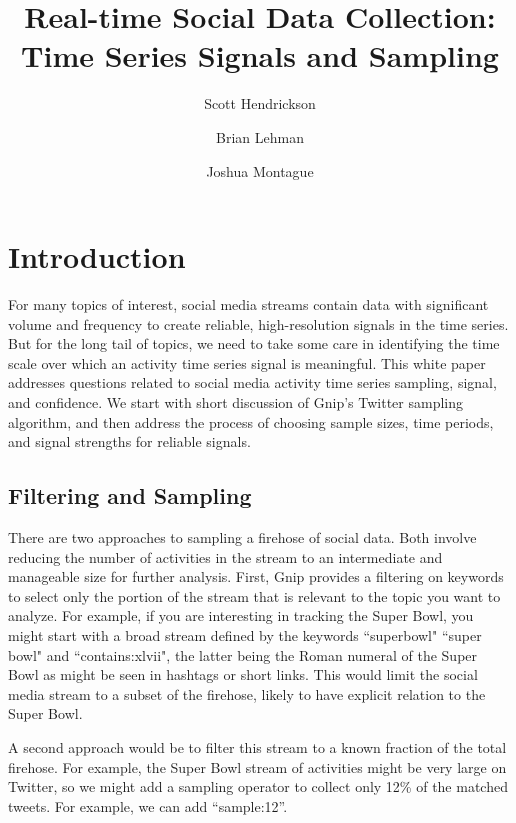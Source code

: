 \documentclass{article}
\title{Real-time Social Data Collection: \\ \Large{Time Series Signals and Sampling} }
\author[]{Scott Hendrickson}
\author[]{Brian Lehman}
\author[]{Joshua Montague}
\affil[]{ \Large{Gnip, Inc.} }
\begin{document}
\maketitle


\section{Introduction}

For many topics of interest, social media streams contain data with significant volume and frequency to create reliable, high-resolution signals in the time series.  But for the 
long tail of topics, we need to take some care in identifying the 
time scale over which an activity time series signal is meaningful. This white paper addresses questions related to social media activity time series sampling, signal, and confidence. We start with short discussion of Gnip's Twitter sampling algorithm, and then address the process of choosing sample sizes, time periods, and signal strengths for reliable signals.

\subsection{Filtering and Sampling} 

There are two approaches to sampling a firehose of social data. Both involve reducing the number of activities in the stream to an intermediate and manageable size for further analysis.  
First, Gnip provides a filtering on keywords to select only the portion of the stream that is relevant to the topic you want to analyze. For example, if you are interesting in tracking the Super Bowl, you might start with a broad stream defined by the keywords ``superbowl" ``super bowl" and ``contains:xlvii", the latter being the Roman numeral of the Super Bowl as might be seen in hashtags or short links. This would limit the social media stream to a subset of the firehose, likely to have explicit relation to the Super Bowl.

A second approach would be to filter this stream to a known fraction of the total firehose. For example, the 
Super Bowl stream of activities might be very large on Twitter, so we might add a sampling operator to collect only 12\% of the matched tweets. For example, we can add ``sample:12''.
\end{document}
